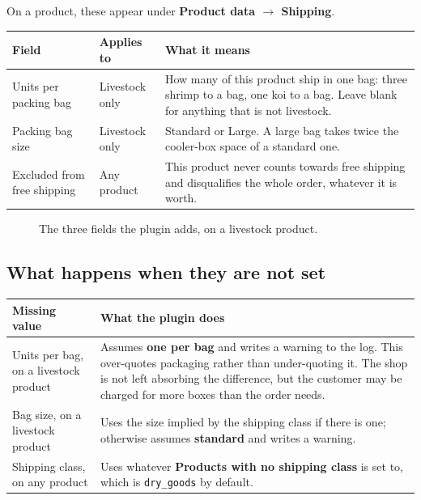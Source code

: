 \documentclass[11pt,a4paper,oneside]{report}
\newcommand{\opt}[1]{\texttt{\small #1}}
\newcommand{\menu}[1]{\textsf{\textbf{#1}}}
\begin{document}
On a product, these appear under \menu{Product data $\rightarrow$ Shipping}.

\begin{longtable}{@{}L{4.2cm}L{2.8cm}L{7.8cm}@{}}
\toprule
\textbf{Field} & \textbf{Applies to} & \textbf{What it means}\\
\midrule
\endhead
Units per packing bag & Livestock only & How many of this product ship in one bag: three shrimp to a bag, one koi to a bag. Leave blank for anything that is not livestock.\\
\addlinespace
Packing bag size & Livestock only & \textsf{Standard} or \textsf{Large}. A large bag takes twice the cooler-box space of a standard one.\\
\addlinespace
Excluded from free shipping & Any product & This product never counts towards free shipping and disqualifies the whole order, whatever it is worth.\\
\bottomrule
\end{longtable}

\begin{figure}[H]
\centering
{}
\caption{The three fields the plugin adds, on a livestock product.}
\label{fig:product-fields}
\end{figure}

\subsection{What happens when they are not set}

\begin{longtable}{@{}L{4.4cm}L{10.4cm}@{}}
\toprule
\textbf{Missing value} & \textbf{What the plugin does}\\
\midrule
\endhead
Units per bag, on a livestock product &
Assumes \textbf{one per bag} and writes a warning to the log. This over-quotes
packaging rather than under-quoting it. The shop is not left absorbing the
difference, but the customer may be charged for more boxes than the order needs.\\
\addlinespace
Bag size, on a livestock product &
Uses the size implied by the shipping class if there is one; otherwise assumes
\textbf{standard} and writes a warning.\\
\addlinespace
Shipping class, on any product &
Uses whatever \textbf{Products with no shipping class} is set to, which is \opt{dry\_goods}
by default.\\
\bottomrule
\end{longtable}
\end{document}
